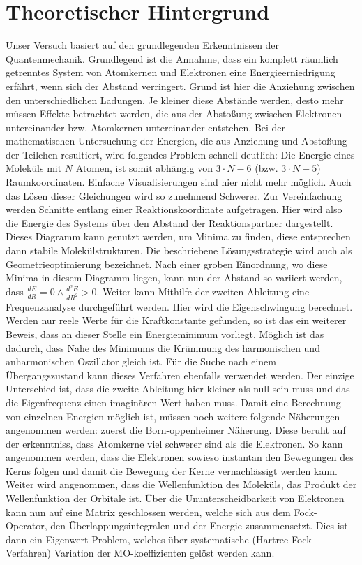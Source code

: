 \section{Theoretischer Hintergrund}
Unser Versuch basiert auf den grundlegenden Erkenntnissen der Quantenmechanik.
Grundlegend ist die Annahme, dass ein komplett räumlich getrenntes System von Atomkernen und Elektronen eine Energieerniedrigung erfährt, wenn sich der Abstand verringert.
Grund ist hier die Anziehung zwischen den unterschiedlichen Ladungen. 
Je kleiner diese Abstände werden, desto mehr müssen Effekte betrachtet werden, die aus der Abstoßung zwischen Elektronen untereinander bzw. Atomkernen untereinander entstehen.
Bei der mathematischen Untersuchung der Energien, die aus Anziehung und Abstoßung der Teilchen resultiert, wird folgendes Problem schnell deutlich:
Die Energie eines Moleküls mit $N$ Atomen, ist somit abhängig von $3\cdot N-6$ (bzw. $3\cdot N-5$) Raumkoordinaten.
Einfache Visualisierungen sind hier nicht mehr möglich.
Auch das Lösen dieser Gleichungen wird so zunehmend Schwerer.
Zur Vereinfachung werden Schnitte entlang einer Reaktionskoordinate aufgetragen.
Hier wird also die Energie des Systems über den Abstand der Reaktionspartner dargestellt.
Dieses Diagramm kann genutzt werden, um Minima zu finden, diese entsprechen dann stabile Molekülstrukturen.
Die beschriebene Lösungsstrategie wird auch als Geometrieoptimierung bezeichnet.
Nach einer groben Einordnung, wo diese Minima in diesem Diagramm liegen, kann nun der Abstand so variiert werden, dass $\frac{dE}{dR}=0\wedge \frac{d^2E}{dR^2}>0$.
Weiter kann Mithilfe der zweiten Ableitung eine Frequenzanalyse durchgeführt werden.
Hier wird die Eigenschwingung berechnet.
Werden nur reele Werte für die Kraftkonstante gefunden, so ist das ein weiterer Beweis, dass an dieser Stelle ein Energieminimum vorliegt.
Möglich ist das dadurch, dass Nahe des Minimums die Krümmung des harmonischen und anharmonischen Oszillator gleich ist.
Für die Suche nach einem Übergangszustand kann dieses Verfahren ebenfalls verwendet werden.
Der einzige Unterschied ist, dass die zweite Ableitung hier kleiner als null sein muss und das die Eigenfrequenz einen imaginären Wert haben muss.
Damit eine Berechnung von einzelnen Energien möglich ist, müssen noch weitere folgende Näherungen angenommen werden:
zuerst die Born-oppenheimer Näherung.
Diese beruht auf der erkenntniss, dass Atomkerne viel schwerer sind als die Elektronen.
So kann angenommen werden, dass die Elektronen sowieso instantan den Bewegungen des Kerns folgen und damit die Bewegung der Kerne vernachlässigt werden kann.
Weiter wird angenommen, dass die Wellenfunktion des Moleküls, das Produkt der Wellenfunktion der Orbitale ist.
Über die Ununterscheidbarkeit von Elektronen kann nun auf eine Matrix geschlossen werden, welche sich aus dem Fock-Operator, den Überlappungsintegralen und der Energie zusammensetzt.
Dies ist dann ein Eigenwert Problem, welches über systematische (Hartree-Fock Verfahren) Variation der MO-koeffizienten gelöst werden kann. 
